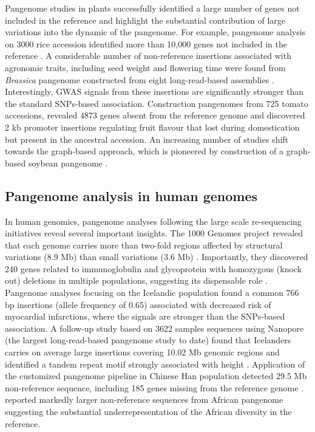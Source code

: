 \documentclass[../main.tex]{subfiles}
\begin{document}
Pangenome studies in plants successfully identified a large number of genes not included in the reference and highlight the substantial contribution of large variations into the dynamic of the pangenome. For example, pangenome analysis on 3000 rice accession identified more than 10,000 genes not included in the reference \citep{wang2018genomic}. A considerable number of non-reference insertions associated with agronomic traits, including seed weight and flowering time were found from \emph{Brassica} pangenome constructed from eight long-read-based assemblies \citep{song2020eight}. Interestingly, GWAS signals from these insertions are significantly stronger than the standard SNPs-based association. Construction pangenomes from 725 tomato accessions, \citet{gao2019tomato} revealed 4873 genes absent from the reference genome and discovered 2 kb promoter insertions regulating fruit flavour that lost during domestication but present in the ancestral accession. An increasing number of studies shift towards the graph-based approach, which is pioneered by construction of a graph-based soybean pangenome \citep{liu2020pan}. 

\subsection*{Pangenome analysis in human genomes}
In human genomics, pangenome analyses following the large scale re-sequencing initiatives reveal several important insights. The 1000 Genomes project  revealed that each genome carries more than two-fold regions affected by structural variations (8.9 Mb) than small variations (3.6 Mb) \citep{10002015global}. Importantly, they discovered 240 genes related to immunoglobulin and glycoprotein with homozygous (knock out) deletions in multiple populations, suggesting its dispensable role \citep{sudmant2015integrated}. Pangenome analyses focusing on the Icelandic population \citep{kehr2017diversity} found a common 766 bp insertions (allele frequency of 0.65) associated with decreased risk of myocardial infarctions, where the signals are stronger than the SNPs-based association. A follow-up study based on 3622 samples sequences using Nanopore (the largest long-read-based pangenome study to date) found that Icelanders carries on average large insertions covering 10.02 Mb genomic regions and identified a tandem repeat motif strongly associated with height \citep{beyter2020long}. Application of the customized pangenome pipeline in Chinese Han population detected 29.5 Mb non-reference sequence, including 185 genes missing from the reference genome \citep{duan2019hupan}. \citet{sherman2019assembly} reported markedly larger non-reference sequences from African pangenome suggesting the substantial underrepresentation of the African diversity in the reference.
\end{document}
